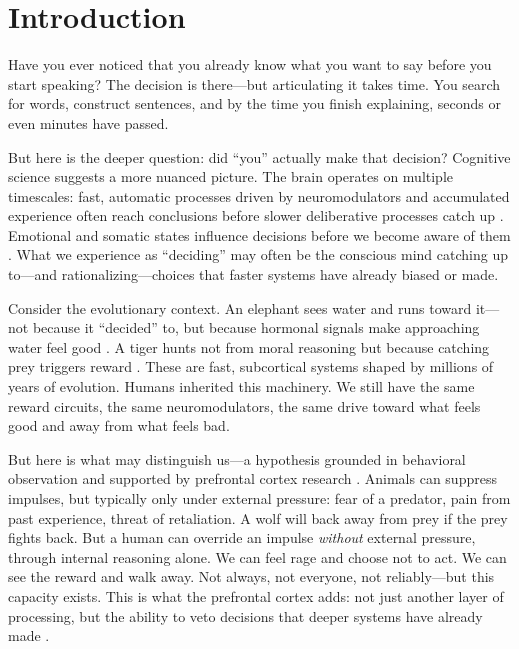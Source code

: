 \documentclass[11pt]{article}
\begin{document}
\section{Introduction}

Have you ever noticed that you already know what you want to say before you start speaking? The decision is there---but articulating it takes time. You search for words, construct sentences, and by the time you finish explaining, seconds or even minutes have passed.

But here is the deeper question: did ``you'' actually make that decision? Cognitive science suggests a more nuanced picture. The brain operates on multiple timescales: fast, automatic processes driven by neuromodulators and accumulated experience often reach conclusions before slower deliberative processes catch up \citep{kahneman2011thinking}. Emotional and somatic states influence decisions before we become aware of them \citep{damasio1994descartes}. What we experience as ``deciding'' may often be the conscious mind catching up to---and rationalizing---choices that faster systems have already biased or made.

Consider the evolutionary context. An elephant sees water and runs toward it---not because it ``decided'' to, but because hormonal signals make approaching water feel good \citep{panksepp2004affective}. A tiger hunts not from moral reasoning but because catching prey triggers reward \citep{berridge2009dissecting}. These are fast, subcortical systems shaped by millions of years of evolution. Humans inherited this machinery. We still have the same reward circuits, the same neuromodulators, the same drive toward what feels good and away from what feels bad.

But here is what may distinguish us---a hypothesis grounded in behavioral observation and supported by prefrontal cortex research \citep{miller2001integrative,fuster2001prefrontal}. Animals can suppress impulses, but typically only under external pressure: fear of a predator, pain from past experience, threat of retaliation. A wolf will back away from prey if the prey fights back. But a human can override an impulse \emph{without} external pressure, through internal reasoning alone. We can feel rage and choose not to act. We can see the reward and walk away. Not always, not everyone, not reliably---but this capacity exists. This is what the prefrontal cortex adds: not just another layer of processing, but the ability to veto decisions that deeper systems have already made \citep{aron2007inhibition}.
\end{document}
